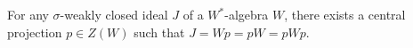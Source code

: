 For any $\sigma$-weakly closed ideal $J$ of a $W^*$-algebra $W$, there exists a central projection $p \in Z(W)$ such that $J = Wp = pW = pWp$.
